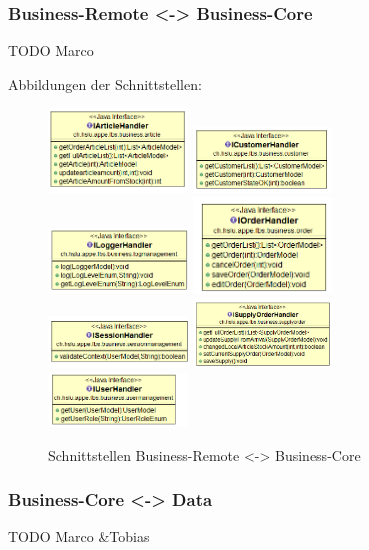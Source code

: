 \subsubsection{Business-Remote <-> Business-Core}
TODO Marco

Abbildungen der Schnittstellen:

\begin{figure}[H]
    {\includegraphics[width=0.33\textwidth]{Images/IArticleHandler}} 
    {\includegraphics[width=0.33\textwidth]{Images/ICustomerHandler}} 
    {\includegraphics[width=0.33\textwidth]{Images/ILoggerHandler}} 
    \newline
    {\includegraphics[width=0.33\textwidth]{Images/IOrderHandler}} 
    {\includegraphics[width=0.33\textwidth]{Images/ISessionHandler}} 
    {\includegraphics[width=0.33\textwidth]{Images/ISupplyOrderHandler}} 
    \newline
    {\includegraphics[width=0.33\textwidth]{Images/IUserHandler}} 
\caption{Schnittstellen Business-Remote <-> Business-Core } 
\end{figure} 


\subsubsection{Business-Core <-> Data}
TODO Marco \&Tobias
